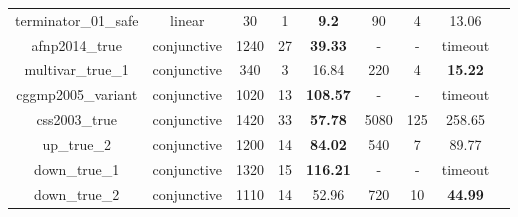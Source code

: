 \begin{table}[t]
\begin{tabular}{l c | c c c | c c c | c }
\multicolumn{1}{|c|}{terminator\_01\_safe}         		&linear 		&30 &1 &\textbf{9.2}  			&90  &4  &13.06  			&\multicolumn{1}{|c|}{\cmark} \\
\multicolumn{1}{|c|}{afnp2014\_true}         			&conjunctive	&1240 &27 &\textbf{39.33}		&- &- &timeout  		&\multicolumn{1}{|c|}{\xmark} \\
\multicolumn{1}{|c|}{multivar\_true\_1}         		&conjunctive 	&340 &3 &16.84  				&220 &4   &\textbf{15.22}  	&\multicolumn{1}{|c|}{\cmark} \\
\multicolumn{1}{|c|}{cggmp2005\_variant}   				&conjunctive 	&1020 &13 &\textbf{108.57}		&- &- &timeout  		&\multicolumn{1}{|c|}{\cmark} \\
\multicolumn{1}{|c|}{css2003\_true}         			&conjunctive 	&1420 &33 &\textbf{57.78}		&5080 &125 &258.65  		&\multicolumn{1}{|c|}{\cmark} \\
\multicolumn{1}{|c|}{up\_true\_2}         				&conjunctive 	&1200 &14 &\textbf{84.02}  		&540 &7   &89.77  			&\multicolumn{1}{|c|}{\cmark} \\
\multicolumn{1}{|c|}{down\_true\_1}         			&conjunctive 	&1320  &15 &\textbf{116.21}  	&-  &-  &timeout  		&\multicolumn{1}{|c|}{\cmark} \\
\multicolumn{1}{|c|}{down\_true\_2}         			&conjunctive 	&1110 &14 &52.96  				&720 &10   &\textbf{44.99}  &\multicolumn{1}{|c|}{\cmark} \\

\hline
\end{tabular}
\label{tbl:stats}
\end{table}

